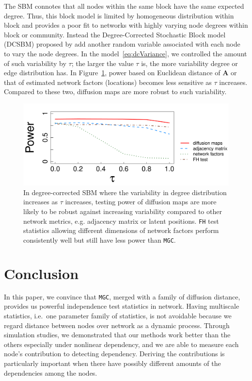 \documentclass[11pt]{article}
\theoremstyle{definition}
\begin{document}
The SBM connotes that all nodes within the same block have the same expected degree. Thus, this block model is limited by homogeneous distribution within block and provides a poor fit to networks with highly varying node degrees within block or community. Instead the Degree-Corrected Stochastic Block model (DCSBM) proposed by \cite{karrer2011stochastic} add another random variable associated with each node to vary the node degrees. In the model~\ref{eq:dcVariance}, we controlled the amount of such variability by $\tau$; the larger the value $\tau$ is, the more variability degree or edge distribution has. In Figure~\ref{fig:dcSBM}, power based on Euclidean distance of $\mathbf{A}$ or that of estimated network factors (locations) becomes less sensitive as $\tau$ increases. Compared to these two, diffusion maps are more robust to such variability. 
\begin{figure}[ht]
	\centering
	\includegraphics[width=0.7\linewidth]{../Figure/tau_simple.pdf}
	\caption{In degree-corrected SBM where the variability in degree distribution increases as $\tau$ increases, testing power of diffusion maps are more likely to be robust against increasing variability compared to other network metrics, e.g. adjacency matrix or latent positions. \texttt{FH} test statistics allowing different dimensions of network factors perform consistently well but still have less power than \texttt{MGC}.}
	\label{fig:dcSBM}
	\vspace*{-0.5cm}
\end{figure}	
\vspace*{-0.5cm}
\section{Conclusion}
\label{sec:conc}
	\vspace*{-0.2cm}
In this paper, we convince that \texttt{MGC}, merged with a family of diffusion distance, provides us powerful independence test statistics in network. Having multiscale statistics, i.e.~one parameter family of statistics, is not avoidable because we regard distance between nodes over network as a dynamic process. Through simulation studies, we demonstrated that our methods work better than the others especially under nonlinear dependency, and we are able to measure each node's contribution to detecting dependency. Deriving the contributions is particularly important when there have possibly different amounts of the dependencies among the nodes.  
\end{document}
